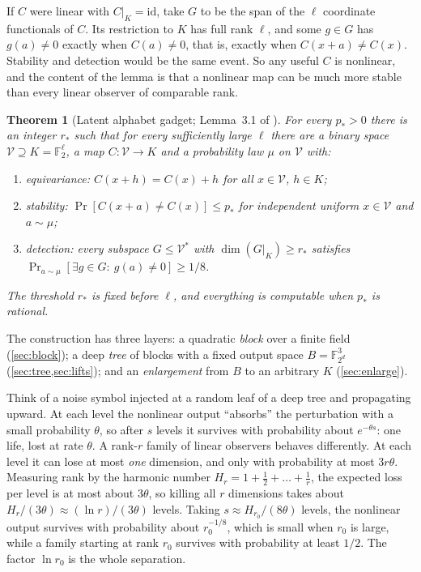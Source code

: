 \documentclass[11pt]{article}
\newtheorem{theorem}{Theorem}[section]
\theoremstyle{definition}
\theoremstyle{remark}
\newcommand{\F}{\mathbb F}
\newcommand{\V}{\mathcal V}
\begin{document}
\begin{idea}
If $C$ were linear with $C|_K=\mathrm{id}$, take $G$ to be the span of the
$\ell$ coordinate functionals of $C$. Its restriction to $K$ has full rank
$\ell$, and some $g\in G$ has $g(a)\ne0$ exactly when $C(a)\ne0$, that is,
exactly when $C(x+a)\ne C(x)$. Stability and detection would be the same
event. So any useful $C$ is nonlinear, and the content of the lemma is that a
nonlinear map can be much more stable than every linear observer of comparable
rank.
\end{idea}

\begin{theorem}[Latent alphabet gadget; Lemma~3.1 of \cite{OpenAI-UGC}]\label{thm:gadget}
For every $p_*>0$ there is an integer $r_*$ such that for every sufficiently
large $\ell$ there are a binary space $\V\supseteq K=\F_2^\ell$, a map
$C\colon\V\to K$ and a probability law $\mu$ on $\V$ with:
\begin{enumerate}[label=(\roman*)]
\item \emph{equivariance:} $C(x+h)=C(x)+h$ for all $x\in\V$, $h\in K$;
\item \emph{stability:} $\Pr[C(x+a)\ne C(x)]\le p_*$ for independent uniform
  $x\in\V$ and $a\sim\mu$;
\item \emph{detection:} every subspace $G\le\V^*$ with $\dim(G|_K)\ge r_*$
  satisfies $\Pr_{a\sim\mu}[\exists g\in G:\ g(a)\ne0]\ge1/8$.
\end{enumerate}
The threshold $r_*$ is fixed before $\ell$, and everything is computable when
$p_*$ is rational.
\end{theorem}

The construction has three layers: a quadratic \emph{block} over a finite field
(\cref{sec:block}); a deep \emph{tree} of blocks with a fixed output space
$B=\F_{2^d}^3$ (\cref{sec:tree,sec:lifts}); and an \emph{enlargement} from
$B$ to an arbitrary $K$ (\cref{sec:enlarge}).

\begin{idea}
Think of a noise symbol injected at a random leaf of a deep tree and
propagating upward. At each level the nonlinear output ``absorbs'' the
perturbation with a small probability $\theta$, so after $s$ levels it survives
with probability about $e^{-\theta s}$: one life, lost at rate $\theta$.
A rank-$r$ family of linear observers behaves differently. At each level it can
lose at most \emph{one} dimension, and only with probability at most
$3r\theta$. Measuring rank by the harmonic number $H_r=1+\frac12+\dots+\frac1r$,
the expected loss per level is at most about $3\theta$, so killing all $r$
dimensions takes about $H_r/(3\theta)\approx(\ln r)/(3\theta)$ levels. Taking
$s\approx H_{r_0}/(8\theta)$ levels, the nonlinear output survives with
probability about $r_0^{-1/8}$, which is small when $r_0$ is large, while a
family starting at rank $r_0$ survives with probability at least $1/2$. The
factor $\ln r_0$ is the whole separation.
\end{idea}
\end{document}

